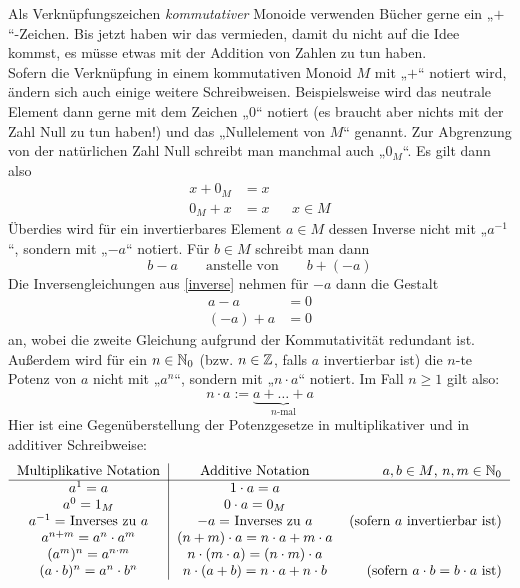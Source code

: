 \begin{bem}
Als Verknüpfungszeichen \emph{kommutativer} Monoide verwenden Bücher gerne ein „$+$“-Zeichen. Bis jetzt haben wir das vermieden, damit du nicht auf die Idee kommst, es müsse etwas mit der Addition von Zahlen zu tun haben. \\[0.5em]
Sofern die Verknüpfung in einem kommutativen Monoid $M$ mit „$+$“ notiert wird, ändern sich auch einige weitere Schreibweisen. Beispielsweise wird das neutrale Element dann gerne mit dem Zeichen „$0$“ notiert (es braucht aber nichts mit der Zahl Null zu tun haben!) und das „Nullelement von $M$“ genannt. Zur Abgrenzung von der natürlichen Zahl Null schreibt man manchmal auch „$0_M$“. Es gilt dann also
\begin{align*}
 x+0_M & = x && \\
 0_M + x & = x && x\in M
\end{align*}
Überdies wird für ein invertierbares Element $a\in M$ dessen Inverse nicht mit „$a^{-1}$“, sondern mit „$-a$“ notiert. Für $b\in M$ schreibt man dann
\[ b-a \qquad\text{anstelle von}\qquad b + (-a) \]
Die Inversengleichungen aus \cref{inverse} nehmen für $-a$ dann die Gestalt
\begin{align*}
 a-a & = 0 \\
 (-a) + a & = 0
\end{align*}
an, wobei die zweite Gleichung aufgrund der Kommutativität redundant ist. \\
Außerdem wird für ein $n\in {\mathbb N}_0$ (bzw. $n\in {\mathbb Z}$, falls $a$ invertierbar ist) die $n$-te Potenz von $a$ nicht mit „$a^n$“, sondern mit „$n\cdot a$“ notiert. Im Fall $n\geq 1$ gilt also:
\[ n\cdot a := \underbrace{a+\ldots + a}_{n\text{-mal}} \]
Hier ist eine Gegenüberstellung der Potenzgesetze in multiplikativer und in additiver Schreibweise:
\[ \begin{tabular}{c|c r}
Multiplikative Notation & Additive Notation & $a,b\in M$,\ $n,m\in \Nz_0$\\
    \hline 
$a^1 = a$ & $1\cdot a=a$ &\\
$a^0 = 1_M$ & $0\cdot a=0_M$ &\\
$a^{-1} =$ Inverses zu $a$ & $-a =$ Inverses zu $a$& (sofern $a$ invertierbar ist) \\
$a^{n+m} = a^n\cdot a^m$ & $(n+m)\cdot a = n\cdot a + m\cdot a$ & \\
$(a^m)^n = a^{n\cdot m}$ & $n\cdot (m\cdot a) = (n\cdot m)\cdot a$ & \\
$(a\cdot b)^n =a^n\cdot b^n$ & $n\cdot (a+b) = n\cdot a+n\cdot b$ & (sofern $a\cdot b=b\cdot a$ ist)

\end{tabular}\]
\end{bem}
